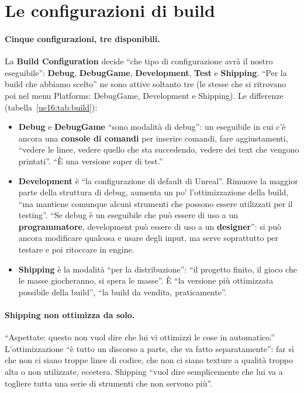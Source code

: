 \section{Le configurazioni di build}
\label{ue16:sec:build}

\paragraph{Cinque configurazioni, tre disponibili.} La \textbf{Build Configuration} decide
``che tipo di configurazione avrà il nostro eseguibile'': \textbf{Debug}, \textbf{DebugGame},
\textbf{Development}, \textbf{Test} e \textbf{Shipping}. ``Per la build che abbiamo scelto''
ne sono attive soltanto tre (le stesse che si ritrovano poi nel menu Platforms: DebugGame,
Development e Shipping). Le differenze (tabella~\ref{ue16:tab:build}):
\begin{itemize}
  \item \textbf{Debug} e \textbf{DebugGame} ``sono modalità di debug'': un eseguibile in cui
        c'è ancora una \textbf{console di comandi} per inserire comandi, fare aggiustamenti,
        ``vedere le linee, vedere quello che sta succedendo, vedere dei text che vengono
        printati''. ``È una versione super di test.''
  \item \textbf{Development} è ``la configurazione di default di Unreal''. Rimuove la maggior
        parte della struttura di debug, aumenta un po' l'ottimizzazione della build, ``ma
        mantiene comunque alcuni strumenti che possono essere utilizzati per il testing''. ``Se
        debug è un eseguibile che può essere di uso a un \textbf{programmatore}, development può
        essere di uso a un \textbf{designer}'': si può ancora modificare qualcosa e usare degli
        input, ma serve soprattutto per testare e poi ritoccare in engine.
  \item \textbf{Shipping} è la modalità ``per la distribuzione'': ``il progetto finito, il
        gioco che le masse giocheranno, si spera le masse''. È ``la versione più ottimizzata
        possibile della build'', ``la build da vendita, praticamente''.
\end{itemize}

\paragraph{Shipping non ottimizza da solo.} ``Aspettate: questo non vuol dire che lui vi
ottimizzi le cose in automatico.'' L'ottimizzazione ``è tutto un discorso a parte, che va fatto
separatamente'': far sì che non ci siano troppe linee di codice, che non ci siano texture a
qualità troppo alta o non utilizzate, eccetera. Shipping ``vuol dire semplicemente che lui va a
togliere tutta una serie di strumenti che non servono più''.

